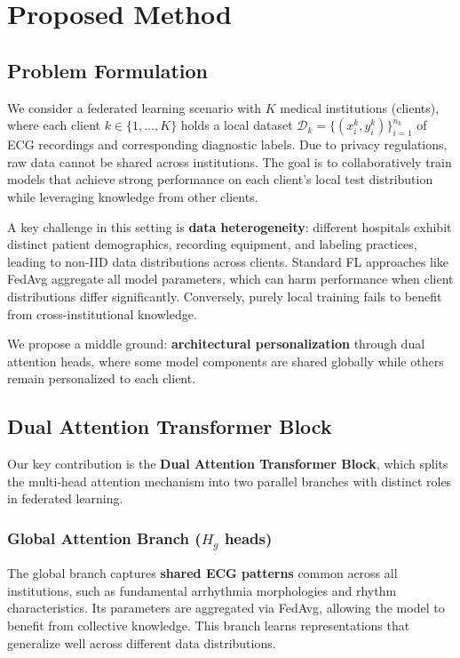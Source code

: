 
\section{Proposed Method}

\subsection{Problem Formulation}

We consider a federated learning scenario with $K$ medical institutions (clients), where each client $k \in \{1, \ldots, K\}$ holds a local dataset $\mathcal{D}_k = \{(x_i^k, y_i^k)\}_{i=1}^{n_k}$ of ECG recordings and corresponding diagnostic labels. Due to privacy regulations, raw data cannot be shared across institutions. The goal is to collaboratively train models that achieve strong performance on each client's local test distribution while leveraging knowledge from other clients.

A key challenge in this setting is \textbf{data heterogeneity}: different hospitals exhibit distinct patient demographics, recording equipment, and labeling practices, leading to non-IID data distributions across clients. Standard FL approaches like FedAvg aggregate all model parameters, which can harm performance when client distributions differ significantly. Conversely, purely local training fails to benefit from cross-institutional knowledge.

We propose a middle ground: \textbf{architectural personalization} through dual attention heads, where some model components are shared globally while others remain personalized to each client.

\subsection{Dual Attention Transformer Block}

Our key contribution is the \textbf{Dual Attention Transformer Block}, which splits the multi-head attention mechanism into two parallel branches with distinct roles in federated learning.

\subsubsection{Global Attention Branch ($H_g$ heads)}
The global branch captures \textbf{shared ECG patterns} common across all institutions, such as fundamental arrhythmia morphologies and rhythm characteristics. Its parameters are aggregated via FedAvg, allowing the model to benefit from collective knowledge. This branch learns representations that generalize well across different data distributions.

